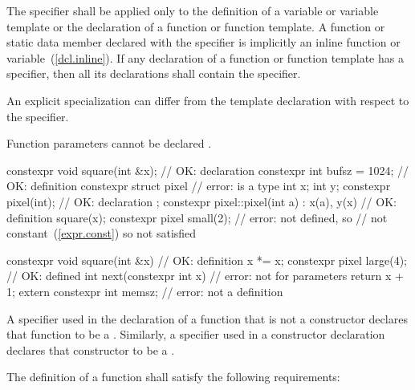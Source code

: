 \pnum
The  specifier shall be applied only to the definition of
a variable or variable template or
the declaration of a
function or function template.
A function or static data member declared with the 
specifier is implicitly an inline function or variable~(\ref{dcl.inline}).
If any declaration of a function or function template has
a  specifier,
then all its declarations shall contain the  specifier. \begin{note} An
explicit specialization can differ from the template declaration with respect to the
 specifier. \end{note}
\begin{note}
Function parameters cannot be declared .\end{note}
\begin{example}
\begin{codeblock}
constexpr void square(int &x);  // OK: declaration
constexpr int bufsz = 1024;     // OK: definition
constexpr struct pixel {        // error:  is a type
  int x;
  int y;
  constexpr pixel(int);         // OK: declaration
}; 
constexpr pixel::pixel(int a)
  : x(a), y(x)                  // OK: definition
  { square(x); }
constexpr pixel small(2);       // error:  not defined, so 
                                // not constant~(\ref{expr.const}) so  not satisfied

constexpr void square(int &x) { // OK: definition
  x *= x;
}
constexpr pixel large(4);       // OK:  defined
int next(constexpr int x) {     // error: not for parameters
     return x + 1;
} 
extern constexpr int memsz;     // error: not a definition 
\end{codeblock}
\end{example}

\pnum
A  specifier used in the declaration of a function that is not a
constructor declares that
function to be a . Similarly, a
 specifier used in 
a constructor declaration declares that constructor to be a
.

\pnum
{}
The definition of a  function shall satisfy the following
requirements:

